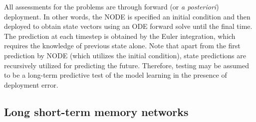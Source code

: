 \documentclass[preprint,12pt]{elsarticle}
\begin{document}
All assessments for the problems are through forward (or \emph{a posteriori}) deployment. In other words, the NODE is specified an initial condition and then deployed to obtain state vectors using an ODE forward solve until the final time. The prediction at each timestep is obtained by the Euler integration, which requires the knowledge of previous state alone. Note that apart from the first prediction by NODE (which utilizes the initial condition), state predictions are recursively utilized for predicting the future. Therefore, testing may be assumed to be a long-term predictive test of the model learning in the presence of deployment error.


\subsection{Long short-term memory networks}
\end{document}

